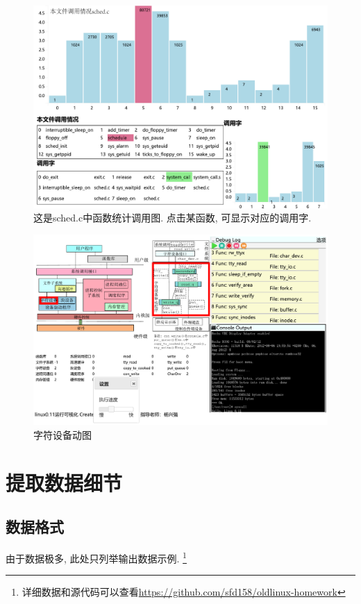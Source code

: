 \documentclass{ctexart}
\begin{document}
\begin{figure}[htbp]
	\centering
	\includegraphics[width=\textwidth,natwidth=590 ,natheight=406]{img/eachFileCall.pdf}
	\caption[]{这是sched.c中函数统计调用图. 点击某函数, 可显示对应的调用字.}
	\label{fig:eachFileCallgraph}
\end{figure}

\begin{figure}[htbp]
	\centering
	\includegraphics[width=\textwidth,natwidth=756 ,natheight=450]{img/chrdrv.pdf}
	\caption[]{字符设备动图}
	\label{fig:ChrDrvgraph}
\end{figure}

\section{提取数据细节}
\subsection{数据格式}
由于数据极多, 此处只列举输出数据示例. 
\footnote{详细数据和源代码可以查看\url{https://github.com/sfd158/oldlinux-homework}}
\end{document}
